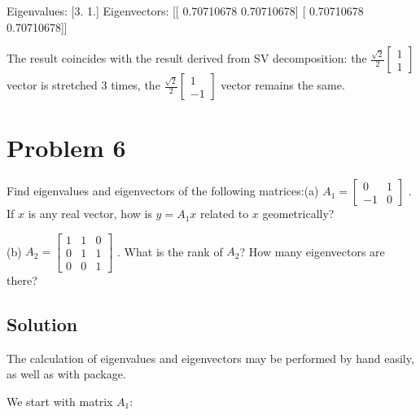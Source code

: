 \documentclass[letterpaper,10pt,english]{jupyterBook}
\begin{document}
\begin{sphinxVerbatim}[commandchars=\\\{\}]
Eigenvalues:  [3. 1.]
Eigenvectors:
[[ 0.70710678 \PYGZhy{}0.70710678]
 [ 0.70710678  0.70710678]]
\end{sphinxVerbatim}

\sphinxAtStartPar
The result coincides with the result derived from SV decomposition: the
\(
\frac{\sqrt{2}}{2}
\begin{bmatrix}
1\\
1
\end{bmatrix}
\)
vector is stretched 3 times, the
\(
\frac{\sqrt{2}}{2}
\begin{bmatrix}
1\\
-1
\end{bmatrix}
\)
vector remains the same.


\section{Problem 6}
\label{\detokenize{notebooks/ProblemSet1:problem-6}}
\sphinxAtStartPar
Find eigenvalues and eigenvectors of the following matrices:(a)
\(A_1=
\begin{bmatrix}
0 & 1\\
-1 & 0
\end{bmatrix}
\)
. If \(x\) is any real vector, how is \(y=A_1x\) related to \(x\) geometrically?

\sphinxAtStartPar
(b)
\(A_2=
\begin{bmatrix}
1 & 1 & 0\\
0 & 1 & 1\\
0 & 0 & 1
\end{bmatrix}
\)
. What is the rank of \(A_2\)? How many eigenvectors are there?


\subsection{Solution}
\label{\detokenize{notebooks/ProblemSet1:id5}}
\sphinxAtStartPar
The calculation of eigenvalues and eigenvectors may be performed by hand easily, as well as with  package.

\sphinxAtStartPar
We start with matrix \(A_1\):
\end{document}
